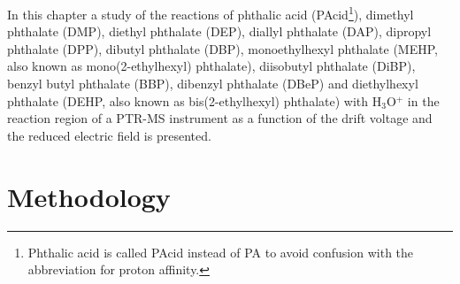 In this chapter a study of the reactions of 
phthalic acid (PAcid\footnote{Phthalic acid is called PAcid instead of PA to avoid confusion with the abbreviation for proton affinity.}),                              %
dimethyl phthalate (DMP),                     %
diethyl phthalate (DEP),                     %
diallyl phthalate (DAP),                       %
dipropyl phthalate (DPP),                      %
dibutyl phthalate (DBP),                       %
monoethylhexyl phthalate (MEHP, also known as mono(2-ethylhexyl) phthalate),               %
diisobutyl phthalate (DiBP),                   %
benzyl butyl phthalate (BBP),                  %
dibenzyl phthalate (DBeP)                         %
and
diethylhexyl phthalate (DEHP, also known as bis(2-ethylhexyl) phthalate)                 %
with H$_3$O$^+$ in the reaction region of a PTR-MS instrument as a function of the drift voltage and the reduced electric field is presented.



\section{Methodology}

